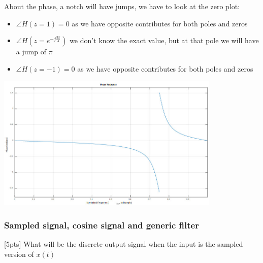 {        About the phase, a notch will have jumps, we have to look at the zero plot:
        \begin{itemize}
            \item $\angle H(z=1)=0$ as we have opposite contributes for both poles and zeros
            \item $\angle H(z=e^{-j\frac{3\pi}{4}})$ we don't know the exact value, but at that pole we will have a jump of $\pi$
            \item $\angle H(z=-1)=0$ as we have opposite contributes for both poles and zeros
        \end{itemize}
        \begin{center}
            \includegraphics[width=0.8\textwidth]{images/20181107_13.png}
        \end{center}
    }

    \subsubsection{Sampled signal, cosine signal and generic filter}
    [5pts] What will be the discrete output signal when the input is the sampled version of $x(t)$

